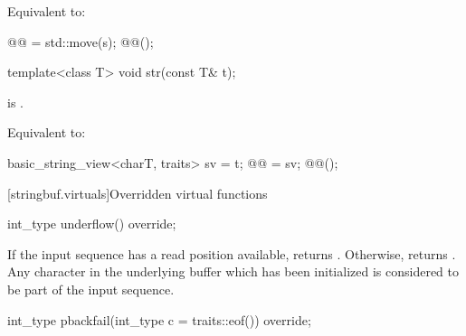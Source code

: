 \begin{itemdescr}
\pnum
\effects
Equivalent to:
\begin{codeblock}
@@ = std::move(s);
@@();
\end{codeblock}
\end{itemdescr}

%
\begin{itemdecl}
template<class T>
  void str(const T& t);
\end{itemdecl}

\begin{itemdescr}
\pnum
\constraints
{}
is .

\pnum
\effects
Equivalent to:
\begin{codeblock}
basic_string_view<charT, traits> sv = t;
@@ = sv;
@@();
\end{codeblock}
\end{itemdescr}

[stringbuf.virtuals]{Overridden virtual functions}

%
\begin{itemdecl}
int_type underflow() override;
\end{itemdecl}

\begin{itemdescr}
\pnum
\returns
If the input sequence has a read position available,
returns
.
Otherwise, returns
.
Any character in the underlying buffer which has been initialized is considered
to be part of the input sequence.
\end{itemdescr}

%
\begin{itemdecl}
int_type pbackfail(int_type c = traits::eof()) override;
\end{itemdecl}

